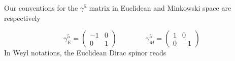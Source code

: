 \documentclass[11pt,aps,amsmath,amssymb,nofootinbib,notitlepage,longbibliography]{revtex4-1}
\newcommand{\be}{\begin{equation}}
\newcommand{\ee}{\end{equation}}
\begin{document}













Our  conventions for the $\gamma^5$ matrix in Euclidean and Minkowski space are respectively

\be
\gamma_E^5=
\begin{pmatrix}
-1& 0\\
0 &1
\end{pmatrix}\qquad\qquad
\gamma_M^5=
\begin{pmatrix}
1& 0\\
0 &-1
\end{pmatrix}
\ee
In Weyl notations, the Euclidean Dirac spinor reads
\end{document}
